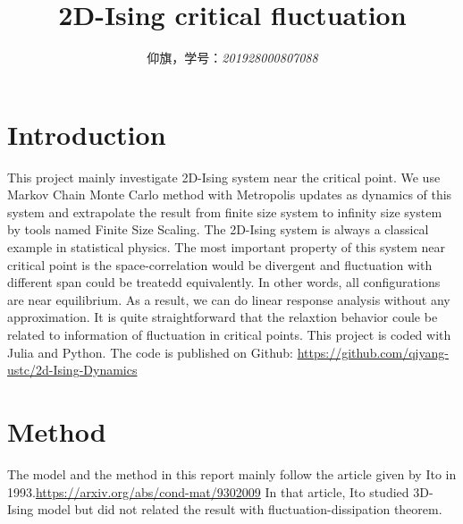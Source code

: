 \documentclass[a4paper]{article}
\begin{document}
\setlength{\leftskip}{20pt}

\title{2D-Ising critical fluctuation}
\author{仰旗，学号：{\it 201928000807088}}

 \maketitle

\section{Introduction}
This project mainly investigate 2D-Ising system near the critical point. We use Markov Chain Monte Carlo method
with Metropolis updates as dynamics of this system and extrapolate the result from finite size system to infinity size
system by tools named Finite Size Scaling.
\newline
The 2D-Ising system is always a classical example in statistical physics. The most important property of this system 
near critical point is the space-correlation would be divergent and fluctuation with different span could be treatedd 
equivalently. In other words, all configurations are near equilibrium. As a result, we can do linear response analysis 
without any approximation. It is quite straightforward that the relaxtion behavior coule be related to information of 
fluctuation in critical points.
\newline
This project is coded with Julia and Python. The code is published on Github: 
\url{https://github.com/qiyang-ustc/2d-Ising-Dynamics}

\section{Method}
The model and the method in this report mainly follow the article given by Ito in 1993.\url{https://arxiv.org/abs/cond-mat/9302009}
In that article, Ito studied 3D-Ising model but did not related the result with fluctuation-dissipation theorem.
\end{document}
